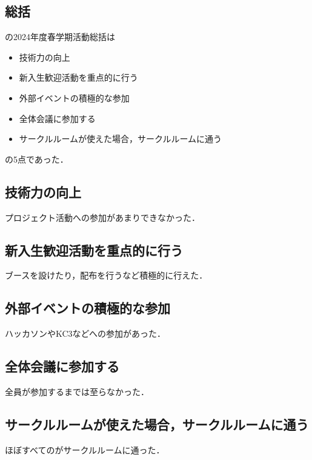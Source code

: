 \subsection*{\secondGrade{}総括}


\secondGrade{}の2024年度春学期活動総括は
\begin{itemize}
    \item 技術力の向上
    \item 新入生歓迎活動を重点的に行う
    \item 外部イベントの積極的な参加
    \item 全体会議に参加する
    \item サークルルームが使えた場合，サークルルームに通う
\end{itemize}
の5点であった．

\subsection*{技術力の向上}
プロジェクト活動への参加があまりできなかった．

\subsection*{新入生歓迎活動を重点的に行う}
ブースを設けたり，配布を行うなど積極的に行えた．

\subsection*{外部イベントの積極的な参加}
ハッカソンやKC3などへの参加があった．

\subsection*{全体会議に参加する}
全員が参加するまでは至らなかった．

\subsection*{サークルルームが使えた場合，サークルルームに通う}
ほぼすべての\secondGrade{}がサークルルームに通った．

